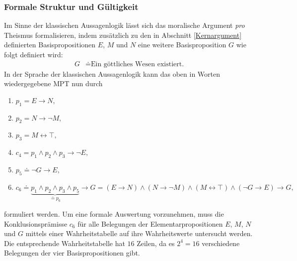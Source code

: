 \documentclass[a4paper,11pt]{article}
\numberwithin{equation}{section}
\begin{document}
\subsubsection{Formale Struktur und Gültigkeit}
Im Sinne der klassischen Aussagenlogik lässt sich das moralische Argument \textit{pro} Theismus formalisieren, indem zusätzlich zu den in Abschnitt \ref{Kernargument} definierten Basispropositionen $E$, $M$ und $N$ eine weitere Basisproposition $G$ wie folgt definiert wird:
\begin{align*}
G &\doteq \text{Ein göttliches Wesen existiert.}
\end{align*}
In der Sprache der klassischen Aussagenlogik kann das oben in Worten wiedergegebene MPT nun durch  \begin{enumerate}
\item $p_1 = E \rightarrow N,$
\item $p_2 = N \rightarrow \neg M,$
\item $p_3 = M \leftrightarrow \top,$
\item $c_4 = p_1 \land p_2 \land p_3 \rightarrow \neg E,$
\item $p_5 \doteq \neg G \rightarrow E,$
\item $c_6 \doteq \underbrace{p_1 \land p_2 \land p_3 \land p_5}_{\doteq p_6} \rightarrow G = (E \rightarrow N) \land (N \rightarrow \neg M) \land (M \leftrightarrow \top) \land (\neg G \rightarrow E) \rightarrow G,$
\end{enumerate} formuliert werden. Um eine formale Auswertung vorzunehmen, muss die Konklusionsprämisse $c_6$ für alle Belegungen der Elementarpropositionen $E$, $M$, $N$ und $G$ mittels einer Wahrheitstabelle auf ihre Wahrheitswerte untersucht werden. Die entsprechende Wahrheitstabelle hat $16$ Zeilen, da es $2^4 = 16$ verschiedene Belegungen der vier Basispropositionen gibt. 
\end{document}
